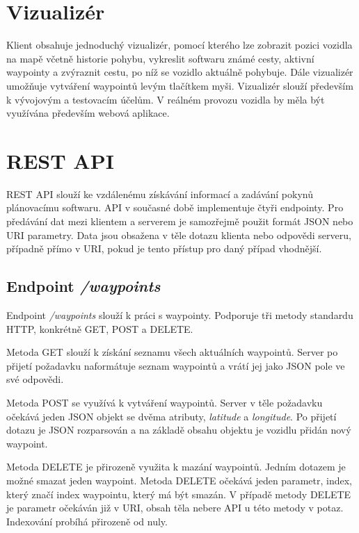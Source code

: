 \documentclass[czech, bachelor]{diploma}
\begin{document}
\section{Vizualizér} \label{visualizer}

Klient obsahuje jednoduchý vizualizér, pomocí kterého lze zobrazit pozici vozidla na mapě včetně historie pohybu, vykreslit
softwaru známé cesty, aktivní waypointy a zvýraznit cestu, po níž se vozidlo aktuálně pohybuje. Dále vizualizér umožňuje vytváření
waypointů levým tlačítkem myši. Vizualizér slouží především k vývojovým a testovacím účelům. V reálném provozu vozidla by měla
být využívána především webová aplikace.

\section{REST API} \label{rest-api}

REST API slouží ke vzdálenému získávání informací a zadávání pokynů plánovacímu softwaru. API v současné době implementuje čtyři
endpointy. Pro předávání dat mezi klientem a serverem je samozřejmě použit formát JSON nebo URI parametry. Data jsou obsažena
v těle dotazu klienta nebo odpovědi serveru, případně přímo v URI, pokud je tento přístup pro daný případ vhodnější.

\subsection{Endpoint \emph{/waypoints}}

Endpoint \emph{/waypoints} slouží k práci s waypointy. Podporuje tři metody standardu HTTP, konkrétně GET, POST a DELETE.

Metoda GET slouží k získání seznamu všech aktuálních waypointů. Server po přijetí požadavku naformátuje seznam waypointů a vrátí
jej jako JSON pole ve své odpovědi.

Metoda POST se využívá k vytváření waypointů. Server v těle požadavku očekává jeden JSON objekt se dvěma atributy, \emph{latitude}
a \emph{longitude}. Po přijetí dotazu je JSON rozparsován a na základě obsahu objektu je vozidlu přidán nový waypoint.

Metoda DELETE je přirozeně využita k mazání waypointů. Jedním dotazem je možné smazat jeden waypoint. Metoda DELETE očekává jeden
parametr, index, který značí index waypointu, který má být smazán. V případě metody DELETE je parametr očekáván již v URI, obsah
těla nebere API u této metody v potaz. Indexování probíhá přirozeně od nuly.
\end{document}
